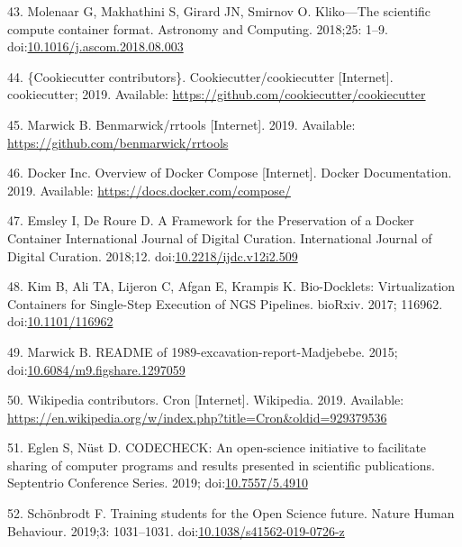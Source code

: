 \documentclass[10pt,letterpaper]{article}
\begin{document}
\leavevmode\hypertarget{ref-molenaar_klikoscientific_2018}{}%
43. Molenaar G, Makhathini S, Girard JN, Smirnov O. Kliko---The
scientific compute container format. Astronomy and Computing. 2018;25:
1--9.
doi:\href{https://doi.org/10.1016/j.ascom.2018.08.003}{10.1016/j.ascom.2018.08.003}

\leavevmode\hypertarget{ref-cookiecutter_contributors_cookiecutter_2019}{}%
44. \{Cookiecutter contributors\}. Cookiecutter/cookiecutter
{[}Internet{]}. cookiecutter; 2019. Available:
\url{https://github.com/cookiecutter/cookiecutter}

\leavevmode\hypertarget{ref-marwick_rrtools_2019}{}%
45. Marwick B. Benmarwick/rrtools {[}Internet{]}. 2019. Available:
\url{https://github.com/benmarwick/rrtools}

\leavevmode\hypertarget{ref-docker-compose_2019}{}%
46. Docker Inc. Overview of Docker Compose {[}Internet{]}. Docker
Documentation. 2019. Available: \url{https://docs.docker.com/compose/}

\leavevmode\hypertarget{ref-emsley_framework_2018}{}%
47. Emsley I, De Roure D. A Framework for the Preservation of a Docker
Container International Journal of Digital Curation. International
Journal of Digital Curation. 2018;12.
doi:\href{https://doi.org/10.2218/ijdc.v12i2.509}{10.2218/ijdc.v12i2.509}

\leavevmode\hypertarget{ref-kim_bio-docklets_2017}{}%
48. Kim B, Ali TA, Lijeron C, Afgan E, Krampis K. Bio-Docklets:
Virtualization Containers for Single-Step Execution of NGS Pipelines.
bioRxiv. 2017; 116962.
doi:\href{https://doi.org/10.1101/116962}{10.1101/116962}

\leavevmode\hypertarget{ref-marwick_readme_2015}{}%
49. Marwick B. README of 1989-excavation-report-Madjebebe. 2015;
doi:\href{https://doi.org/10.6084/m9.figshare.1297059}{10.6084/m9.figshare.1297059}

\leavevmode\hypertarget{ref-wikipedia_contributors_cron_2019}{}%
50. Wikipedia contributors. Cron {[}Internet{]}. Wikipedia. 2019.
Available:
\url{https://en.wikipedia.org/w/index.php?title=Cron\&oldid=929379536}

\leavevmode\hypertarget{ref-eglen_codecheck_2019}{}%
51. Eglen S, Nüst D. CODECHECK: An open-science initiative to facilitate
sharing of computer programs and results presented in scientific
publications. Septentrio Conference Series. 2019;
doi:\href{https://doi.org/10.7557/5.4910}{10.7557/5.4910}

\leavevmode\hypertarget{ref-schonbrodt_training_2019}{}%
52. Schönbrodt F. Training students for the Open Science future. Nature
Human Behaviour. 2019;3: 1031--1031.
doi:\href{https://doi.org/10.1038/s41562-019-0726-z}{10.1038/s41562-019-0726-z}
\end{document}
